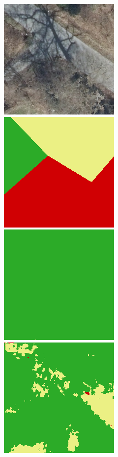 \begin{figure}
    \vspace{3mm}
    \includegraphics[width=\DensenetPredictionsImageWidth]{images/densenet/436897-image} \hfill
    \includegraphics[width=\DensenetPredictionsImageWidth]{images/densenet/436897-label} \hfill
    \includegraphics[width=\DensenetPredictionsImageWidth]{images/densenet/densenet-103D/436897-prediction} \hfill
    \includegraphics[width=\DensenetPredictionsImageWidth]{images/densenet/densenet-103CD/436897-prediction} \hfill

\end{figure}
